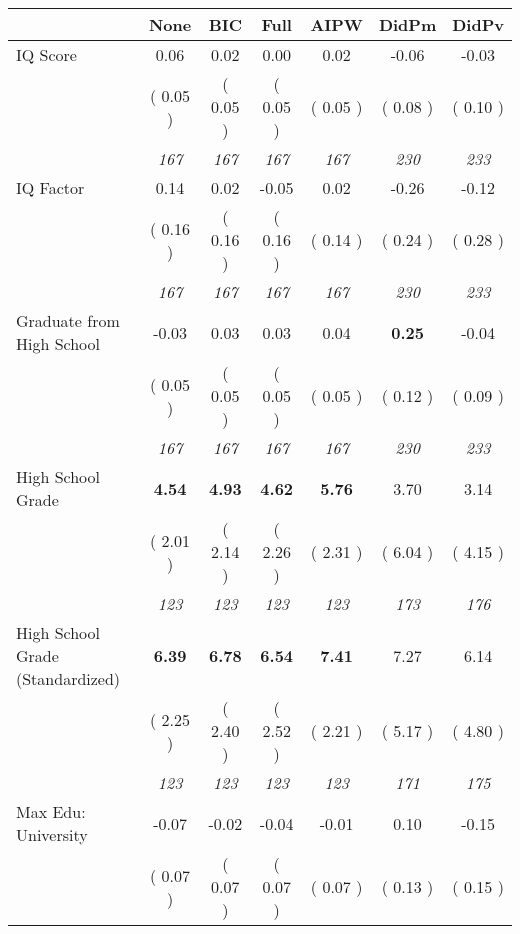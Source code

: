 \begin{tabular}{l c c c c c c}
\toprule
 & None & BIC & Full & AIPW & DidPm & DidPv \\
\midrule
IQ Score &      0.06 &      0.02 &      0.00 &      0.02 &     -0.06 &     -0.03 \\
& (     0.05 ) & (     0.05 ) & (     0.05 ) & (     0.05 ) & (     0.08 ) & (     0.10 ) \\
& \textit{ 167 } & \textit{ 167 } & \textit{ 167 } & \textit{ 167 } & \textit{ 230 } & \textit{ 233 } \\
IQ Factor &      0.14 &      0.02 &     -0.05 &      0.02 &     -0.26 &     -0.12 \\
& (     0.16 ) & (     0.16 ) & (     0.16 ) & (     0.14 ) & (     0.24 ) & (     0.28 ) \\
& \textit{ 167 } & \textit{ 167 } & \textit{ 167 } & \textit{ 167 } & \textit{ 230 } & \textit{ 233 } \\
Graduate from High School &     -0.03 &      0.03 &      0.03 &      0.04 & \textbf{      0.25 } &     -0.04 \\
& (     0.05 ) & (     0.05 ) & (     0.05 ) & (     0.05 ) & (     0.12 ) & (     0.09 ) \\
& \textit{ 167 } & \textit{ 167 } & \textit{ 167 } & \textit{ 167 } & \textit{ 230 } & \textit{ 233 } \\
High School Grade & \textbf{      4.54 } & \textbf{      4.93 } & \textbf{      4.62 } & \textbf{     5.76} &      3.70 &      3.14 \\
& (     2.01 ) & (     2.14 ) & (     2.26 ) & (     2.31 ) & (     6.04 ) & (     4.15 ) \\
& \textit{ 123 } & \textit{ 123 } & \textit{ 123 } & \textit{ 123 } & \textit{ 173 } & \textit{ 176 } \\
High School Grade (Standardized) & \textbf{      6.39 } & \textbf{      6.78 } & \textbf{      6.54 } & \textbf{     7.41} &      7.27 &      6.14 \\
& (     2.25 ) & (     2.40 ) & (     2.52 ) & (     2.21 ) & (     5.17 ) & (     4.80 ) \\
& \textit{ 123 } & \textit{ 123 } & \textit{ 123 } & \textit{ 123 } & \textit{ 171 } & \textit{ 175 } \\
Max Edu: University &     -0.07 &     -0.02 &     -0.04 &     -0.01 &      0.10 &     -0.15 \\
& (     0.07 ) & (     0.07 ) & (     0.07 ) & (     0.07 ) & (     0.13 ) & (     0.15 ) \\

\end{tabular}
